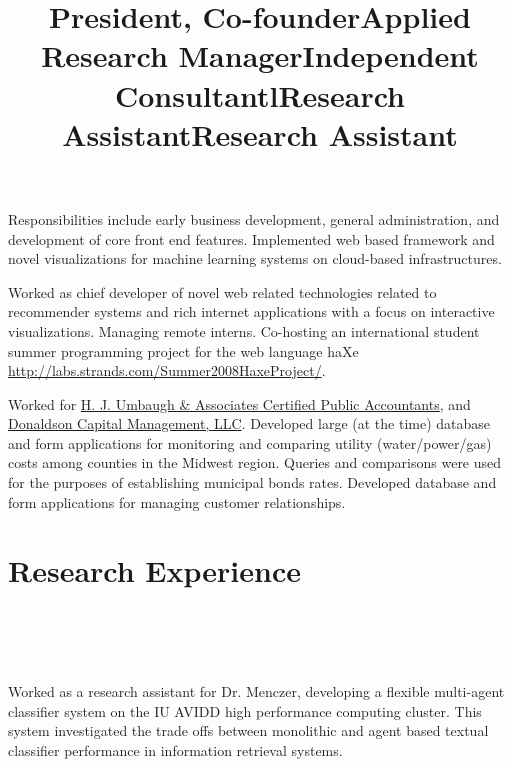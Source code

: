 \documentclass[overlapped,line,letterpaper]{res}
\begin{document}
\begin{resume}
\title{President, Co-founder}
\begin{position}
Responsibilities include early business development, general administration, and development of core front end features. Implemented web based framework and novel visualizations for machine learning systems on cloud-based infrastructures.
\end{position}


\title{Applied Research Manager}
\begin{position}
Worked as chief developer of novel web related technologies related to recommender systems and rich internet applications with a focus on interactive visualizations.  Managing remote interns.  Co-hosting an international student summer programming project for the web language haXe \url{http://labs.strands.com/Summer2008HaxeProject/}.
\end{position}

\title{Independent Consultant}
\begin{position}
Worked for \href{http://www.hju.com}{H. J. Umbaugh \& Associates Certified Public Accountants}, and \href{http://www.dcmol.com}{Donaldson Capital Management, LLC}.
Developed large (at the time) database and form applications for monitoring and comparing utility (water/power/gas) costs among counties in the Midwest region.  Queries and comparisons were used for the purposes of establishing municipal bonds rates.
Developed database and form applications for managing customer relationships.

\end{position}

\section{\bf Research Experience}

\begin{format}
\title{l}\\
\\
\body\\
\end{format}

\title{Research Assistant}
\title{Research Assistant}
\begin{position}
Worked as a research assistant for Dr. Menczer, developing a flexible multi-agent classifier system on the IU AVIDD high performance computing cluster.  This system investigated the trade offs between monolithic and agent based textual classifier performance in information retrieval systems.
\end{position}


\end{resume}
\end{document}
